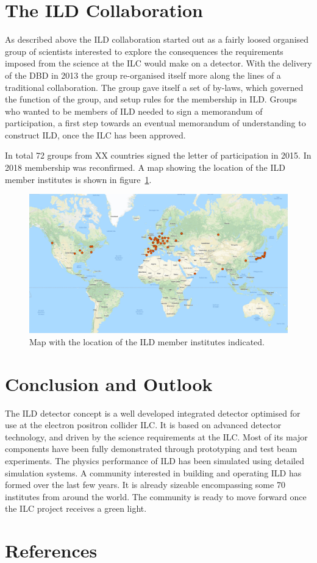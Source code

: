 \documentclass[%
 amsmath,amssymb,
 aps,
]{revtex4-1}
\begin{document}
\section{The ILD Collaboration}
As described above the ILD collaboration started out as a fairly loosed organised group of scientists interested to explore the consequences the requirements imposed from the science at the ILC would make on a detector. With the delivery of the DBD in 2013 the group re-organised itself more along the lines of a traditional collaboration. The group gave itself a set of by-laws, which governed the function of the group, and setup rules for the membership in ILD. Groups who wanted to be members of ILD needed to sign a memorandum of participation, a first step towards an eventual memorandum of understanding to construct ILD, once the ILC has been approved. 

In total 72 groups from XX countries signed the letter of participation in 2015. In 2018 membership was reconfirmed. A map showing the location of the ILD member institutes is shown in figure~\ref{ild-fig-membermap}.

\begin{figure}
    \centering
    \includegraphics[width=0.6\hsize]{figures/ILD_members_map.pdf}
    \caption{Map with the location of the ILD member institutes indicated.}
    \label{ild-fig-membermap}
\end{figure}



\section{Conclusion and Outlook}
The ILD detector concept is a well developed integrated detector optimised for use at the electron positron collider ILC. It is based on advanced detector technology, and driven by the science requirements at the ILC. Most of its major components have been fully demonstrated through prototyping and test beam experiments. The physics performance of ILD has been simulated using detailed simulation systems. A community interested in building and operating ILD has formed over the last few years. It is already sizeable encompassing some 70 institutes from around the world. The community is ready to move forward once the ILC project receives a green light. 

\section{References}


\end{document}
